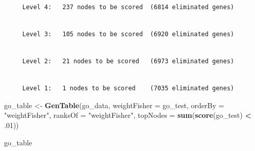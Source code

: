 \documentclass[]{article}
\newenvironment{Shaded}{\begin{snugshade}}{\end{snugshade}}
\newcommand{\KeywordTok}[1]{\textcolor[rgb]{0.13,0.29,0.53}{\textbf{#1}}}
\newcommand{\DataTypeTok}[1]{\textcolor[rgb]{0.13,0.29,0.53}{#1}}
\newcommand{\DecValTok}[1]{\textcolor[rgb]{0.00,0.00,0.81}{#1}}
\newcommand{\StringTok}[1]{\textcolor[rgb]{0.31,0.60,0.02}{#1}}
\newcommand{\OperatorTok}[1]{\textcolor[rgb]{0.81,0.36,0.00}{\textbf{#1}}}
\newcommand{\NormalTok}[1]{#1}
\begin{document}
\begin{verbatim}

     Level 4:   237 nodes to be scored  (6814 eliminated genes)
\end{verbatim}

\begin{verbatim}

     Level 3:   105 nodes to be scored  (6920 eliminated genes)
\end{verbatim}

\begin{verbatim}

     Level 2:   21 nodes to be scored   (6973 eliminated genes)
\end{verbatim}

\begin{verbatim}

     Level 1:   1 nodes to be scored    (7035 eliminated genes)
\end{verbatim}

\begin{Shaded}
\begin{Highlighting}[]
\NormalTok{go_table <-}\StringTok{ }\KeywordTok{GenTable}\NormalTok{(go_data, }\DataTypeTok{weightFisher =}\NormalTok{ go_test,}
                         \DataTypeTok{orderBy =} \StringTok{"weightFisher"}\NormalTok{, }\DataTypeTok{ranksOf =} \StringTok{"weightFisher"}\NormalTok{,}
                         \DataTypeTok{topNodes =} \KeywordTok{sum}\NormalTok{(}\KeywordTok{score}\NormalTok{(go_test) }\OperatorTok{<}\StringTok{ }\NormalTok{.}\DecValTok{01}\NormalTok{))}

\NormalTok{go_table}
\end{Highlighting}
\end{Shaded}
\end{document}
